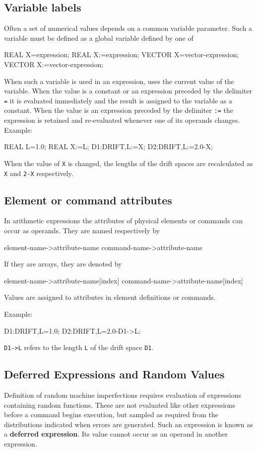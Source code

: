 \subsection{Variable labels}
\label{sec:avariable}
Often a set of numerical values depends
on a common variable parameter.
Such a variable must be defined as a global
variable  defined by one of
\begin{example}
REAL X=expression;
REAL X:=expression;
VECTOR X=vector-expression;
VECTOR X:=vector-expression;
\end{example}
When such a variable is used in an expression,
\opal uses the current value of the variable.
When the value is a constant or an expression preceded by the delimiter
\texttt{=} it is evaluated immediately and the result is assigned to the
variable as a constant.
When the value is an expression preceded by the delimiter \texttt{:=}
the expression is retained and re-evaluated whenever one of its operands
changes.\\
\noindent Example:
\begin{example}
REAL L=1.0;
REAL X:=L;
D1:DRIFT,L:=X;
D2:DRIFT,L:=2.0-X;
\end{example}
When the value of \texttt{X} is changed,
the lengths of the drift spaces are recalculated as
\texttt{X} and \texttt{2-X} respectively.

\subsection{Element or command attributes}
In arithmetic expressions the attributes of physical elements
or commands can occur as operands.
They are named respectively by
\begin{example}
element-name->attribute-name
command-name->attribute-name
\end{example}
If they are arrays, they are denoted by
\begin{example}
element-name->attribute-name[index]
command-name->attribute-name[index]
\end{example}
Values are assigned to attributes in element definitions or commands.

\noindent Example:
\begin{example}
D1:DRIFT,L=1.0;
D2:DRIFT,L=2.0-D1->L;
\end{example}
\texttt{D1->L} refers to the length \texttt{L} of the drift space \texttt{D1}.

\subsection{Deferred Expressions and Random Values}
\label{sec:adefer}
Definition of random machine imperfections requires evaluation
of expressions containing random functions.
These are not evaluated like other expressions before a command
begins execution, but sampled as required from the distributions
indicated when errors are generated.
Such an expression is known as a \textbf{deferred expression}.
Its value cannot occur as an operand in another expression.

